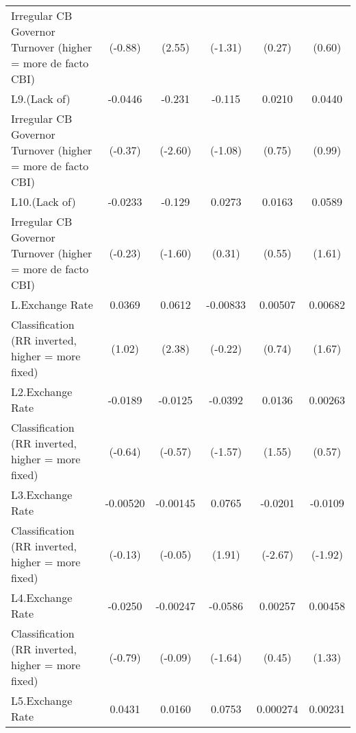 {\begin{tabular}{l*{5}{c}}
Irregular CB Governor Turnover (higher = more de facto CBI)&     (-0.88)         &      (2.55)         &     (-1.31)         &      (0.27)         &      (0.60)         \\
[1em]
L9.(Lack of)        &     -0.0446         &      -0.231\sym{*}  &      -0.115         &      0.0210         &      0.0440         \\
Irregular CB Governor Turnover (higher = more de facto CBI)&     (-0.37)         &     (-2.60)         &     (-1.08)         &      (0.75)         &      (0.99)         \\
[1em]
L10.(Lack of)       &     -0.0233         &      -0.129         &      0.0273         &      0.0163         &      0.0589         \\
Irregular CB Governor Turnover (higher = more de facto CBI)&     (-0.23)         &     (-1.60)         &      (0.31)         &      (0.55)         &      (1.61)         \\
[1em]
L.Exchange Rate     &      0.0369         &      0.0612\sym{*}  &    -0.00833         &     0.00507         &     0.00682         \\
Classification (RR inverted, higher = more fixed)&      (1.02)         &      (2.38)         &     (-0.22)         &      (0.74)         &      (1.67)         \\
[1em]
L2.Exchange Rate    &     -0.0189         &     -0.0125         &     -0.0392         &      0.0136         &     0.00263         \\
Classification (RR inverted, higher = more fixed)&     (-0.64)         &     (-0.57)         &     (-1.57)         &      (1.55)         &      (0.57)         \\
[1em]
L3.Exchange Rate    &    -0.00520         &    -0.00145         &      0.0765         &     -0.0201\sym{**} &     -0.0109         \\
Classification (RR inverted, higher = more fixed)&     (-0.13)         &     (-0.05)         &      (1.91)         &     (-2.67)         &     (-1.92)         \\
[1em]
L4.Exchange Rate    &     -0.0250         &    -0.00247         &     -0.0586         &     0.00257         &     0.00458         \\
Classification (RR inverted, higher = more fixed)&     (-0.79)         &     (-0.09)         &     (-1.64)         &      (0.45)         &      (1.33)         \\
[1em]
L5.Exchange Rate    &      0.0431         &      0.0160         &      0.0753\sym{*}  &    0.000274         &     0.00231         \\

\end{tabular}}
